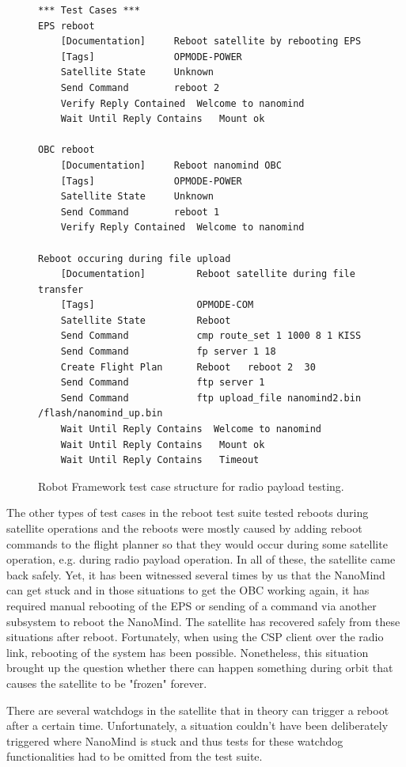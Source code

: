 \documentclass[english,12pt,a4paper,pdftex,elec,utf8]{aaltothesis}
\begin{document}
\begin{figure}[h!]
\centering
\begin{verbatim}
*** Test Cases ***
EPS reboot
	[Documentation]		Reboot satellite by rebooting EPS
	[Tags]				OPMODE-POWER
	Satellite State 	Unknown
	Send Command		reboot 2
	Verify Reply Contained 	Welcome to nanomind
    Wait Until Reply Contains   Mount ok

OBC reboot
	[Documentation]		Reboot nanomind OBC
	[Tags]				OPMODE-POWER
	Satellite State 	Unknown
	Send Command		reboot 1
	Verify Reply Contained 	Welcome to nanomind
	
Reboot occuring during file upload
    [Documentation]         Reboot satellite during file transfer
    [Tags]                  OPMODE-COM
    Satellite State         Reboot
    Send Command            cmp route_set 1 1000 8 1 KISS
    Send Command            fp server 1 18
    Create Flight Plan      Reboot   reboot 2  30
    Send Command            ftp server 1
    Send Command            ftp upload_file nanomind2.bin /flash/nanomind_up.bin
    Wait Until Reply Contains  Welcome to nanomind
    Wait Until Reply Contains   Mount ok
    Wait Until Reply Contains   Timeout
\end{verbatim}
\caption{Robot Framework test case structure for radio payload testing.}
\label{robotreboot}
\end{figure}
The other types of test cases in the reboot test suite tested reboots during satellite operations and the reboots were mostly caused by adding reboot commands to the flight planner so that they would occur during some satellite operation, e.g. during radio payload operation. In all of these, the satellite came back safely. Yet, it has been witnessed several times by us that the NanoMind can get stuck and in those situations to get the OBC working again, it has required manual rebooting of the EPS or sending of a command via another subsystem to reboot the NanoMind. The satellite has recovered safely from these situations after reboot. Fortunately, when using the CSP client over the radio link, rebooting of the system has been possible. Nonetheless, this situation brought up the question whether there can happen something during orbit that causes the satellite to be "frozen" forever.\par
There are several watchdogs in the satellite that in theory can trigger a reboot after a certain time. Unfortunately, a situation couldn't have been deliberately triggered where NanoMind is stuck and thus tests for these watchdog functionalities had to be omitted from the test suite.\\
\end{document}

